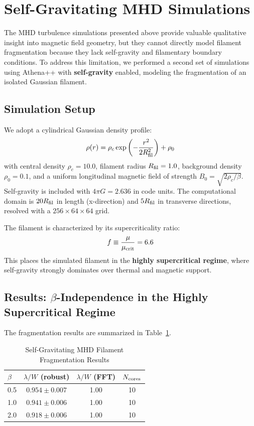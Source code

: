 \documentclass[11pt,a4paper]{article}
\begin{document}
\section{Self-Gravitating MHD Simulations}
\label{sec:simulations_sg}

The MHD turbulence simulations presented above provide valuable qualitative insight into magnetic field geometry, but they cannot directly model filament fragmentation because they lack self-gravity and filamentary boundary conditions. To address this limitation, we performed a second set of simulations using Athena++ with \textbf{self-gravity} enabled, modeling the fragmentation of an isolated Gaussian filament.

\subsection{Simulation Setup}

We adopt a cylindrical Gaussian density profile:
\begin{equation}
\rho(r) = \rho_c \exp\left(-\frac{r^2}{2 R_{\rm fil}^2}\right) + \rho_0
\end{equation}
with central density $\rho_c = 10.0$, filament radius $R_{\rm fil} = 1.0$, background density $\rho_0 = 0.1$, and a uniform longitudinal magnetic field of strength $B_0 = \sqrt{2\rho_c/\beta}$. Self-gravity is included with $4\pi G = 2.636$ in code units. The computational domain is $20 R_{\rm fil}$ in length (x-direction) and $5 R_{\rm fil}$ in transverse directions, resolved with a $256 \times 64 \times 64$ grid.

The filament is characterized by its supercriticality ratio:
\begin{equation}
f \equiv \frac{\mu}{\mu_{\rm crit}} = 6.6
\end{equation}
This places the simulated filament in the \textbf{highly supercritical regime}, where self-gravity strongly dominates over thermal and magnetic support.

\subsection{Results: $\beta$-Independence in the Highly Supercritical Regime}

The fragmentation results are summarized in Table~\ref{tab:mhd_sg}.

\begin{table}[H]
\centering
\caption{Self-Gravitating MHD Filament Fragmentation Results}
\label{tab:mhd_sg}
\begin{tabular}{lccc}
\toprule
$\beta$ & $\lambda/W$ (robust) & $\lambda/W$ (FFT) & $N_{\rm cores}$ \\
\midrule
0.5 & $0.954 \pm 0.007$ & 1.00 & 10 \\
1.0 & $0.941 \pm 0.006$ & 1.00 & 10 \\
2.0 & $0.918 \pm 0.006$ & 1.00 & 10 \\
\bottomrule
\end{tabular}
\end{table}
\end{document}
